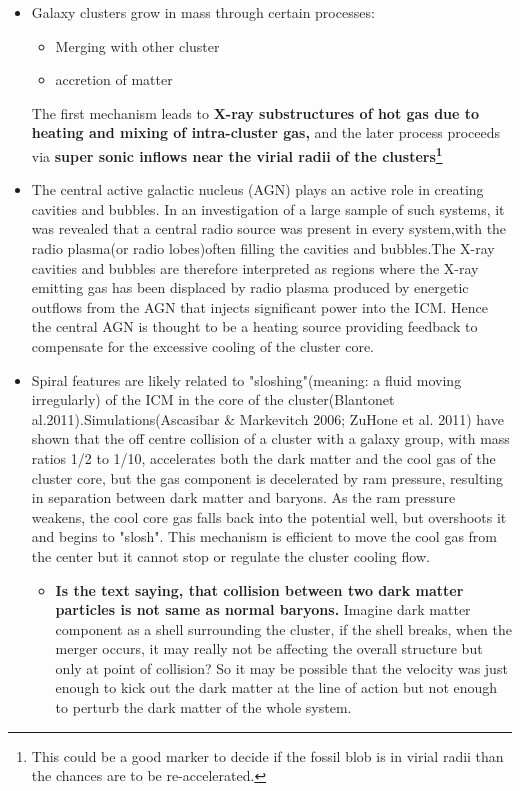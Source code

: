 \documentclass[11pt]{report}
\newcommand{\tbf}[1]{\textbf{#1}}
\newcommand{\fn}[1]{\footnote{#1}}
\begin{document}
\begin{itemize}
\begin{itemize}
\item Galaxy clusters grow in mass through certain processes:
\begin{itemize}
\item Merging with other cluster
\item accretion of matter
\end{itemize}
The first mechanism leads to \tbf{X-ray substructures of hot gas due to heating and mixing of intra-cluster gas,}  and the later process proceeds via \tbf{super sonic inflows near the virial radii of the clusters\fn{This could be a good marker to decide if the fossil blob is in virial radii than the chances are to be re-accelerated.}}
\item  The central active galactic nucleus (AGN) plays an active role in creating cavities and bubbles. In an investigation of a large sample of such systems, it was revealed that a central radio source was present in every system,with the radio plasma(or radio lobes)often filling the cavities and bubbles.The X-ray cavities and bubbles are therefore interpreted as regions where the X-ray emitting gas has been displaced by radio plasma produced by energetic outflows from the AGN that injects significant power into the ICM. Hence the central AGN is thought to be a heating source providing feedback to compensate for the excessive cooling of the cluster core. 
\item Spiral features are likely related to "sloshing"(meaning: a fluid moving irregularly) of the ICM in the core of the cluster(Blantonet al.2011).Simulations(Ascasibar $\&$ Markevitch 2006; ZuHone et al. 2011)  have shown that the off centre collision of a cluster with a galaxy group, with mass ratios  1/2 to 1/10, accelerates both the dark matter and the cool gas of the cluster core, but the gas component is decelerated by ram pressure, resulting in separation between dark matter and baryons.  As the ram pressure weakens, the cool core gas falls back into the potential well, but overshoots it and begins to "slosh". This mechanism is efficient to move the cool gas from the center but it cannot stop or regulate the cluster cooling flow.
\begin{itemize}
\item  \tbf{Is the text saying, that collision between two dark matter particles is not same as normal baryons.} Imagine  dark matter component as a shell surrounding the cluster, if the shell breaks, when the merger occurs, it may really not be affecting the overall structure but only at point of collision? So it may be possible that the velocity was just enough to kick out the dark matter at the line of action but not enough to perturb the dark matter of the whole system.

\end{itemize}
\end{itemize}
\end{itemize}
\end{document}
